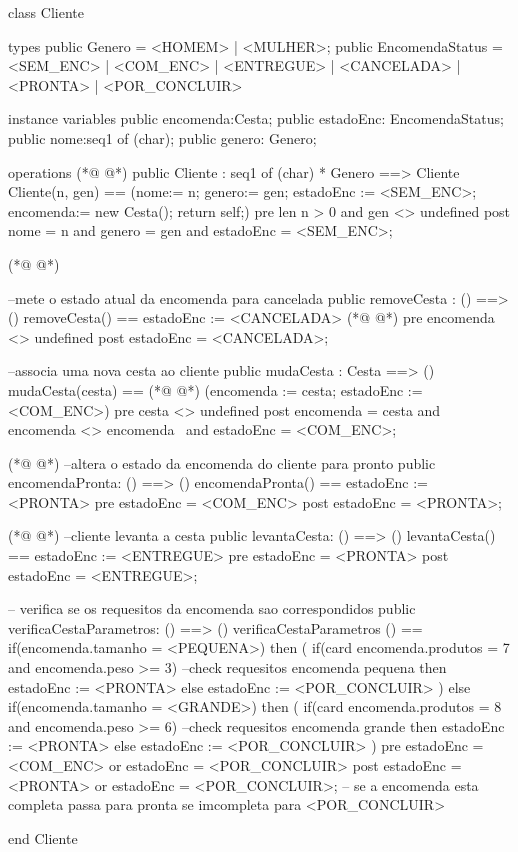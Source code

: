 \begin{vdmpp}[breaklines=true]
class Cliente

types 
 public Genero = <HOMEM> | <MULHER>;
 public EncomendaStatus = <SEM_ENC> | <COM_ENC> | <ENTREGUE> | <CANCELADA> | <PRONTA> | <POR_CONCLUIR>
 
instance variables
  public encomenda:Cesta;
  public estadoEnc: EncomendaStatus;
  public nome:seq1 of (char);
  public genero: Genero;

operations
(*@
\label{Cliente:14}
@*)
  public  Cliente : seq1 of (char) * Genero ==> Cliente
  Cliente(n, gen) == (nome:= n; genero:= gen; estadoEnc := <SEM_ENC>; encomenda:= new Cesta(); return self;)
  pre len n > 0 and gen <> undefined
  post nome = n and genero = gen and estadoEnc = <SEM_ENC>;
  
(*@
\label{removeCesta:19}
@*)
  
  --mete o estado atual da encomenda para cancelada
  public  removeCesta : ()  ==> ()
  removeCesta() == estadoEnc := <CANCELADA>
(*@
\label{mudaCesta:23}
@*)
  pre encomenda <> undefined
  post estadoEnc = <CANCELADA>;
 
 --associa uma nova cesta ao cliente
  public  mudaCesta : Cesta ==> ()
  mudaCesta(cesta) ==
(*@
\label{encomendaPronta:29}
@*)
    (encomenda := cesta; estadoEnc := <COM_ENC>)
  pre cesta <> undefined
  post encomenda = cesta and encomenda <> encomenda~ and estadoEnc = <COM_ENC>;

 
(*@
\label{levantaCesta:34}
@*)
 --altera  o estado da encomenda do cliente para pronto
 public encomendaPronta: () ==> () 
 encomendaPronta() == estadoEnc := <PRONTA>
 pre estadoEnc = <COM_ENC>
 post estadoEnc = <PRONTA>;
 
(*@
\label{verificaCestaParametros:40}
@*)
  --cliente levanta a cesta 
 public levantaCesta: () ==> () 
 levantaCesta() == estadoEnc := <ENTREGUE>
 pre estadoEnc = <PRONTA> 
 post estadoEnc = <ENTREGUE>;
 
 
 -- verifica se os requesitos da encomenda sao correspondidos
 public verificaCestaParametros: () ==> ()
 verificaCestaParametros () ==
  if(encomenda.tamanho = <PEQUENA>)
   then (
    if(card encomenda.produtos = 7 and encomenda.peso >= 3) --check requesitos encomenda pequena
    then estadoEnc := <PRONTA>
    else  estadoEnc := <POR_CONCLUIR>
   )
   else if(encomenda.tamanho = <GRANDE>)
   then (
    if(card encomenda.produtos = 8 and encomenda.peso >= 6) --check requesitos encomenda grande
     then estadoEnc := <PRONTA>
     else estadoEnc := <POR_CONCLUIR>
   )
 pre estadoEnc = <COM_ENC> or estadoEnc = <POR_CONCLUIR>
 post estadoEnc = <PRONTA> or estadoEnc = <POR_CONCLUIR>; -- se a encomenda esta completa passa para pronta se imcompleta para <POR_CONCLUIR>
 
end Cliente
\end{vdmpp}
